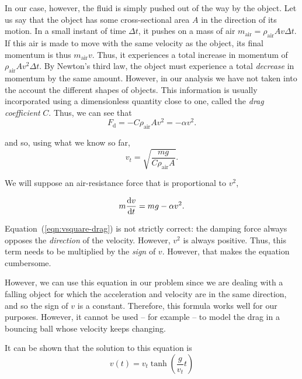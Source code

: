 In our case, however, the fluid is simply pushed out of the way by the object. Let us say that the object has some cross-sectional area $A$ in the direction of its motion. In a small instant of time $\Delta t$, it pushes on a mass of air $m_\text{air} = \rho_\text{air} A v \Delta t$. If this air is made to move with the same velocity as the object, its final momentum is thus $m_\text{air} v$. Thus, it experiences a total increase in momentum of $\rho_\text{air} A v^2 \Delta t$. By Newton's third law, the object must experience a total \textsl{decrease} in momentum by the same amount. However, in our analysis we have not taken into the account the different shapes of objects. This information is usually incorporated using a dimensionless quantity close to one, called the \textsl{drag coefficient} $C$. Thus, we can see that 
\begin{equation}
    F_\text{d} = - C \rho_\text{air} A v^2 = - \alpha v^2.
\end{equation}

and so, using what we know so far,
\begin{equation}
    v_t = \sqrt{\frac{m g}{C \rho_\text{air} A}}.
\end{equation}

We will suppose an air-resistance force that is proportional to $v^2$,

\begin{equation}
    m \dv{v}{t} = m g - \alpha v^2.
    \label{eqn:vsquare-drag}
\end{equation} 

\begin{imp}
    Equation~(\ref{eqn:vsquare-drag}) is not strictly correct: the damping force always opposes the \textsl{direction} of the velocity. However, $v^2$ is always positive. Thus, this term needs to be multiplied by the \textsl{sign} of $v$. However, that makes the equation cumbersome. 
    
    However, we can use this equation in our problem since we are dealing with a falling object for which the acceleration and velocity are in the same direction, and so the sign of $v$ is a constant. Therefore, this formula works well for our purposes. However, it cannot be used -- for example -- to model the drag in a bouncing ball whose velocity keeps changing.
\end{imp}

It can be shown that the solution to this equation is
\begin{equation}
    v(t) = v_t \tanh{\left( \frac{g}{v_t}t\right)}
    \label{v2terminal}
\end{equation}


